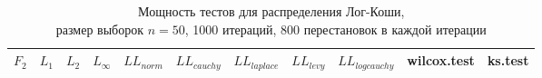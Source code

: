 \documentclass{article}
\begin{document}
\newpage

\begin{longtable}{|c|c|c|c|c|c|c|c|c|c|c|}
  \caption{Мощность тестов для распределения Лог-Коши,\\размер выборок $n=50$, 1000 итераций, 800 перестановок в каждой итерации}
  \label{table:n50} \\
  \hline
  $F_2$ & $L_{1}$ & $L_{2}$ & $L_{\infty}$ & $LL_{norm}$ & $LL_{cauchy}$ & $LL_{laplace}$ & $LL_{levy}$ & $LL_{logcauchy}$ & wilcox.test & ks.test \\ \hline
  
\end{longtable}
\end{document}

